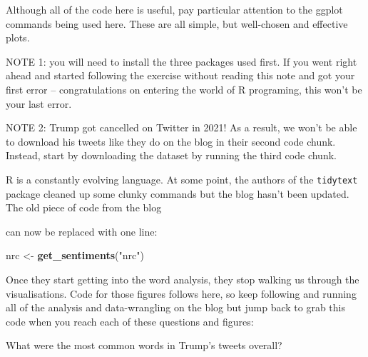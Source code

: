 \documentclass[]{article}
\newenvironment{Shaded}{\begin{snugshade}}{\end{snugshade}}
\newcommand{\DataTypeTok}[1]{\textcolor[rgb]{0.13,0.29,0.53}{#1}}
\newcommand{\DecValTok}[1]{\textcolor[rgb]{0.00,0.00,0.81}{#1}}
\newcommand{\KeywordTok}[1]{\textcolor[rgb]{0.13,0.29,0.53}{\textbf{#1}}}
\newcommand{\NormalTok}[1]{#1}
\newcommand{\OperatorTok}[1]{\textcolor[rgb]{0.81,0.36,0.00}{\textbf{#1}}}
\newcommand{\OtherTok}[1]{\textcolor[rgb]{0.56,0.35,0.01}{#1}}
\newcommand{\StringTok}[1]{\textcolor[rgb]{0.31,0.60,0.02}{#1}}
\begin{document}
Although all of the code here is useful, pay particular attention to the
ggplot commands being used here. These are all simple, but well-chosen
and effective plots.

NOTE 1: you will need to install the three packages used first. If you
went right ahead and started following the exercise without reading this
note and got your first error -- congratulations on entering the world
of R programing, this won't be your last error.

NOTE 2: Trump got cancelled on Twitter in 2021! As a result, we won't be
able to download his tweets like they do on the blog in their second
code chunk. Instead, start by downloading the dataset by running the
third code chunk.

R is a constantly evolving language. At some point, the authors of the
\texttt{tidytext} package cleaned up some clunky commands but the blog
hasn't been updated. The old piece of code from the blog

\begin{Shaded}
\end{Shaded}

can now be replaced with one line:

\begin{Shaded}
\begin{Highlighting}[]
\NormalTok{nrc <-}\StringTok{ }\KeywordTok{get_sentiments}\NormalTok{(}\StringTok{"nrc"}\NormalTok{)}
\end{Highlighting}
\end{Shaded}

Once they start getting into the word analysis, they stop walking us
through the visualisations. Code for those figures follows here, so keep
following and running all of the analysis and data-wrangling on the blog
but jump back to grab this code when you reach each of these questions
and figures:

What were the most common words in Trump's tweets overall?

\begin{Shaded}
\end{Shaded}
\end{document}
